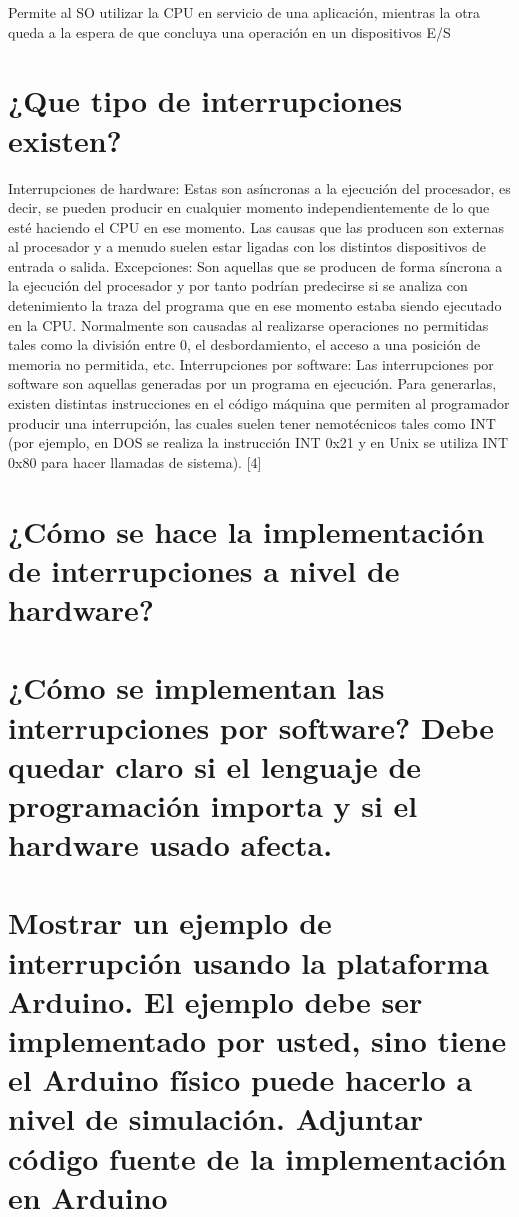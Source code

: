 \documentclass{article}
\begin{document}
Permite al SO utilizar la CPU en servicio de una aplicación, mientras la otra queda a la espera de que concluya una operación en un dispositivos E/S




\section{¿Que tipo de interrupciones existen?}
Interrupciones de hardware: Estas son asíncronas a la ejecución del procesador, es decir, se pueden producir en cualquier momento independientemente de lo que esté haciendo el CPU en ese momento. Las causas que las producen son externas al procesador y a menudo suelen estar ligadas con los distintos dispositivos de entrada o salida.
Excepciones: Son aquellas que se producen de forma síncrona a la ejecución del procesador y por tanto podrían predecirse si se analiza con detenimiento la traza del programa que en ese momento estaba siendo ejecutado en la CPU. Normalmente son causadas al realizarse operaciones no permitidas tales como la división entre 0, el desbordamiento, el acceso a una posición de memoria no permitida, etc.
Interrupciones por software: Las interrupciones por software son aquellas generadas por un programa en ejecución. Para generarlas, existen distintas instrucciones en el código máquina que permiten al programador producir una interrupción, las cuales suelen tener nemotécnicos tales como INT (por ejemplo, en DOS se realiza la instrucción INT 0x21 y en Unix se utiliza INT 0x80 para hacer llamadas de sistema). [4]




\section{¿Cómo se hace la implementación de interrupciones a nivel de hardware?}







\section{¿Cómo se implementan las interrupciones por software? Debe quedar claro si el lenguaje de programación importa y si el hardware usado afecta.}






\section{Mostrar un ejemplo de interrupción usando la plataforma Arduino. El ejemplo debe ser implementado por usted, sino tiene el Arduino físico puede hacerlo a nivel de simulación. Adjuntar código fuente de la implementación en Arduino}
\end{document}
